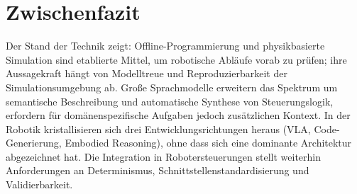 \section*{Zwischenfazit}

Der Stand der Technik zeigt: Offline-Programmierung und physikbasierte
Simulation sind etablierte Mittel, um robotische Abläufe vorab zu prüfen; ihre
Aussagekraft hängt von Modelltreue und Reproduzierbarkeit der
Simulationsumgebung ab. Große Sprachmodelle erweitern das Spektrum um
semantische Beschreibung und automatische Synthese von Steuerungslogik,
erfordern für domänenspezifische Aufgaben jedoch zusätzlichen Kontext. In der
Robotik kristallisieren sich drei Entwicklungsrichtungen heraus (VLA,
Code-Generierung, Embodied Reasoning), ohne dass sich eine dominante Architektur
abgezeichnet hat. Die Integration in Robotersteuerungen stellt weiterhin
Anforderungen an Determinismus, Schnittstellenstandardisierung und
Validierbarkeit.
